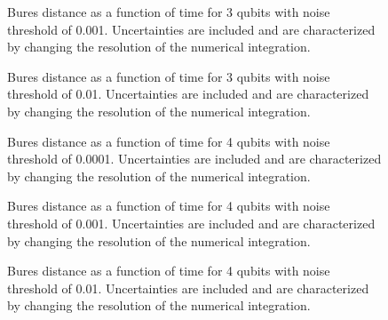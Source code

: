 \begin{figure}
\begin{center}
\end{center}
\caption{Bures distance as a function of time for 3 qubits with noise
threshold of 0.001.  Uncertainties are included and are characterized 
by changing the resolution of the numerical integration.}
\end{figure}

\pagebreak

\begin{figure}
\begin{center}
\end{center}
\caption{Bures distance as a function of time for 3 qubits with noise
threshold of 0.01.  Uncertainties are included and are characterized 
by changing the resolution of the numerical integration.}
\end{figure}

\pagebreak

\begin{figure}
\begin{center}
\end{center}
\caption{Bures distance as a function of time for 4 qubits with noise
threshold of 0.0001.  Uncertainties are included and are characterized 
by changing the resolution of the numerical integration.}
\end{figure}

\pagebreak

\begin{figure}
\begin{center}
\end{center}
\caption{Bures distance as a function of time for 4 qubits with noise
threshold of 0.001.  Uncertainties are included and are characterized 
by changing the resolution of the numerical integration.}
\end{figure}

\pagebreak

\begin{figure}
\begin{center}
\end{center}
\caption{Bures distance as a function of time for 4 qubits with noise
threshold of 0.01.  Uncertainties are included and are characterized 
by changing the resolution of the numerical integration.}
\end{figure}

